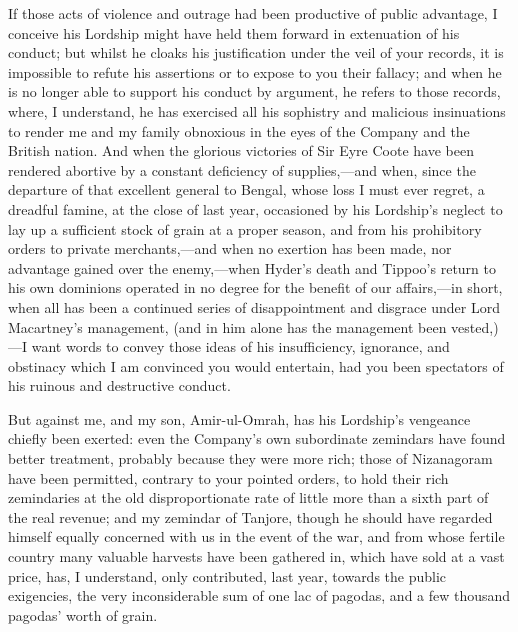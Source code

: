 If those acts of violence and outrage had been productive of public advantage, I conceive his Lordship might have held them forward in extenuation of his conduct; but whilst he cloaks his justification under the veil of your records, it is impossible to refute his assertions or to expose to you their fallacy; and when he is no longer able to support his conduct by argument, he refers to those records, where, I understand, he has exercised all his sophistry and malicious insinuations to render me and my family obnoxious in the eyes of the Company and the British nation. And when the glorious victories of Sir Eyre Coote have been rendered abortive by a constant deficiency of supplies,—and when, since the departure of that excellent general to Bengal, whose loss I must ever regret, a dreadful famine, at the close of last year, occasioned by his Lordship's neglect to lay up a sufficient stock of grain at a proper season, and from his prohibitory orders to private merchants,—and when no exertion has been made, nor advantage gained over the enemy,—when Hyder's death and Tippoo's return to his own dominions operated in no degree for the benefit of our affairs,—in short, when all has been a continued series of disappointment and disgrace under Lord Macartney's management, (and in him alone has the management been vested,)—I want words to convey those ideas of his insufficiency, ignorance, and obstinacy which I am convinced you would entertain, had you been spectators of his ruinous and destructive conduct.

But against me, and my son, Amir-ul-Omrah, has his Lordship's vengeance chiefly been exerted: even the Company's own subordinate zemindars have found better treatment, probably because they were more rich; those of Nizanagoram have been permitted, contrary to your pointed orders, to hold their rich zemindaries at the old disproportionate rate of little more than a sixth part of the real revenue; and my zemindar of Tanjore, though he should have regarded himself equally concerned with us in the event of the war, and from whose fertile country many valuable harvests have been gathered in, which have sold at a vast price, has, I understand, only contributed, last year, towards the public exigencies, the very inconsiderable sum of one lac of pagodas, and a few thousand pagodas' worth of grain.

